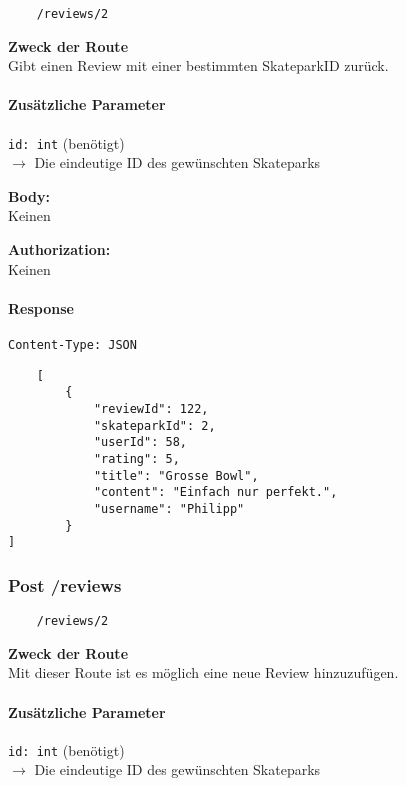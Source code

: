 \begin{lstlisting}
    /reviews/2
\end{lstlisting}

\textbf{Zweck der Route} \\
Gibt einen Review mit einer bestimmten SkateparkID zurück.



\paragraph{Zusätzliche Parameter}
\lstinline{id: int} (benötigt) \\
$\rightarrow$ Die eindeutige ID des gewünschten Skateparks


\textbf{Body:} \\
Keinen

\textbf{Authorization:} \\
Keinen

\paragraph{Response }

\lstinline{Content-Type: JSON}
\begin{lstlisting}
    [
        {
            "reviewId": 122,
            "skateparkId": 2,
            "userId": 58,
            "rating": 5,
            "title": "Grosse Bowl",
            "content": "Einfach nur perfekt.",
            "username": "Philipp"
        }
]
\end{lstlisting}

\pagebreak


\subsubsection{Post /reviews}

\begin{lstlisting}
    /reviews/2
\end{lstlisting}

\textbf{Zweck der Route} \\
Mit dieser Route ist es möglich eine neue Review hinzuzufügen.




\paragraph{Zusätzliche Parameter}
\lstinline{id: int} (benötigt) \\
$\rightarrow$ Die eindeutige ID des gewünschten Skateparks


